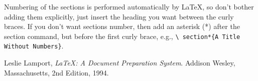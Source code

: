 \documentclass{article}
\begin{document}
    Numbering of the sections is performed automatically by \LaTeX{}, so don't
    bother adding them explicitly, just insert the heading you want between
    the curly braces.  If you don't want sections number, then add an asterisk (*) after the
    section command, but before the first curly brace, e.g., \texttt{\textbackslash
    section*\{A Title Without Numbers\}}.

    \begin{thebibliography}{9}
        Leslie Lamport,
        \emph{\LaTeX: A Document Preparation System}.
        Addison Wesley, Massachusetts,
        2nd Edition,
        1994.

    \end{thebibliography} %
\end{document}
